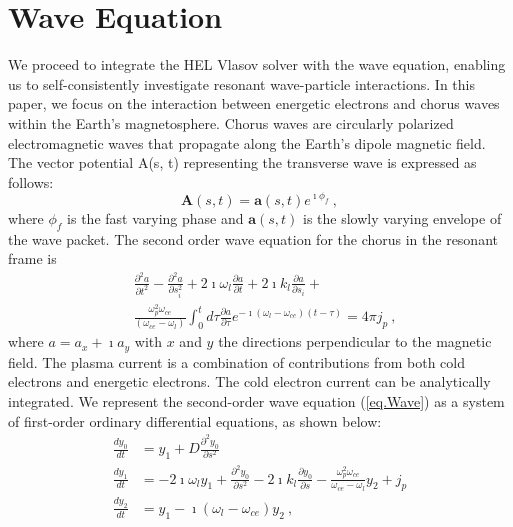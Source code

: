 \section{Wave Equation}
\label{sec:wave}

We proceed to integrate the HEL Vlasov solver with the wave equation, enabling us to self-consistently investigate resonant wave-particle interactions. In this paper, we focus on the interaction between energetic electrons and chorus waves within the Earth's magnetosphere. Chorus waves are circularly polarized electromagnetic waves that propagate along the Earth's dipole magnetic field. The vector potential A(s, t) representing the transverse wave is expressed as follows:
\begin{equation}
    \mathbf{A}(s,t) = \mathbf{a}(s,t)e^{\imath \phi_f}~,
\end{equation}
where $\phi_f$ is the fast varying phase and $\mathbf{a}(s,t)$ is the slowly varying envelope of the wave packet. 
The second order wave equation for the chorus in the resonant frame  is 
\begin{equation}\label{eq.Wave}
    \begin{aligned}
        &\frac{\partial^2 a}{\partial t^2} - \frac{\partial^2 a}{\partial s_i^2} + {2\imath\omega_l}\frac{\partial a}{\partial t} + 2\imath k_l\frac{\partial a}{\partial s_i} + \\
        &\frac{\omega_p^2 \omega_{ce}}{(\omega_{ce}-\omega_l)} \int_0^t d \tau \frac{\partial a}{\partial \tau} e^{-\imath\left(\omega_l-\omega_{c e}\right)(t-\tau)} = {4\pi}j_p~,
        \end{aligned}
      \end{equation}
where $a = a_x + \imath a_y$ with $x$ and $y$ the directions perpendicular to the  magnetic field. 
The plasma current is a combination of contributions from both cold electrons and energetic electrons. The cold electron current can be analytically integrated. We represent the second-order wave equation (\ref{eq.Wave}) as a system of first-order ordinary differential equations, as shown below:
\begin{equation}\label{eq.Wave2}
    \begin{aligned}
        \frac{d y_0}{d t} & = y_1 + D \frac{\partial^2 y_0}{\partial s^2}
        \\
        \frac{d y_1}{d t} & =-2 \imath \omega_l y_1+\frac{\partial^2 y_0}{\partial s^2}-2 \imath k_l \frac{\partial y_0}{\partial s}- \frac{\omega^2_p\omega_{ce}}{\omega_{ce}-\omega_l}y_{2} +j_p\\
        \frac{d y_2}{d t} & =y_1-\imath\left(\omega_l-\omega_{ce}\right) y_2~,
        \end{aligned}
\end{equation}
